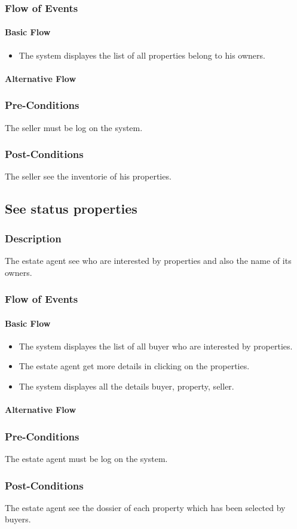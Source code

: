 \documentclass[a4paper,12pt]{article}
\begin{document}
\subsubsection{Flow of Events}
\paragraph{Basic Flow}
\begin{itemize}
\item The system displayes the list of all properties belong to his owners.
\end{itemize}
\paragraph{Alternative Flow}
\begin{itemize}
\end{itemize}
\subsubsection{Pre-Conditions}
The seller must be log on the system.
\subsubsection{Post-Conditions}
The seller see the inventorie of his properties.

\subsection{See status properties}
\subsubsection{Description}
The estate agent see who are interested by properties and also the name of its owners.
\subsubsection{Flow of Events}
\paragraph{Basic Flow}
\begin{itemize}
\item The system displayes the list of all buyer who are interested by properties.
\item The estate agent get more details in clicking on the properties.
\item The system displayes all the details buyer, property, seller.
\end{itemize}
\paragraph{Alternative Flow}
\begin{itemize}
\end{itemize}
\subsubsection{Pre-Conditions}
The estate agent must be log on the system.
\subsubsection{Post-Conditions}
The estate agent see the dossier of each property which has been selected by buyers.
\end{document}
